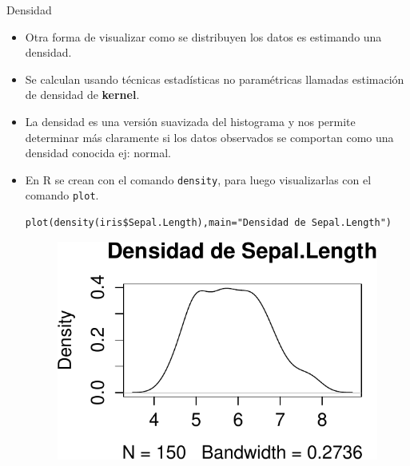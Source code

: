 \documentclass[handout]{beamer}
\begin{document}
\begin{frame}[fragile]{Densidad }
\scriptsize{
\begin{itemize}
 \item Otra forma de visualizar como se distribuyen los datos es estimando una densidad.
 \item Se calculan usando técnicas estadísticas no paramétricas llamadas estimación de densidad de \textbf{kernel}.
 \item La densidad es una versión suavizada del histograma y nos permite determinar más claramente si los datos observados se comportan como una densidad conocida ej: normal. 
 \item En R se crean con el comando \verb+density+, para luego visualizarlas con el comando \verb+plot+.

 \begin{verbatim}
plot(density(iris$Sepal.Length),main="Densidad de Sepal.Length")
 \end{verbatim}
 \begin{figure}[h!]
	\centering
	\includegraphics[scale=0.5]{imagenes/density.pdf}
	
	
\end{figure} 

\end{itemize}




}
\end{frame}
\end{document}
